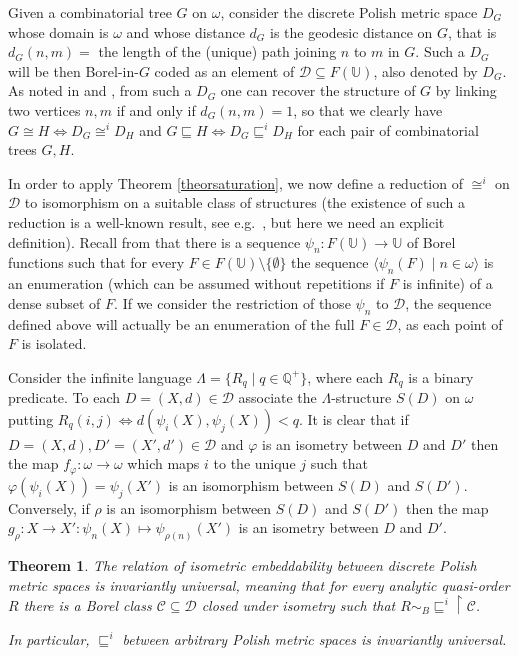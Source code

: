 \documentclass{amsart}
\newtheorem{theorem}{Theorem}[section]
\theoremstyle{definition}
\theoremstyle{remark}
\begin{document}
Given a combinatorial tree $G$ on $\omega$, consider the discrete Polish metric space $D_G$
whose domain is $\omega$ and whose distance $d_G$ is
the geodesic distance on $G$, that is $d_G(n,m) = $ the length of the (unique) path joining
$n$ to $m$ in $G$. Such a $D_G$ will be then
Borel-in-$G$ coded as an element of $\mathcal{D} \subseteq F( \mathbb U )$, also denoted by
$D_G$. As noted in \cite{louros}
and \cite{FriMot}, from such a $D_G$ one can recover the structure of
$G$ by linking two vertices $n,m$ if and only if $d_G(n,m) = 1$, so
that we clearly have $G \cong H \iff D_G \cong^i D_H$ and $G
\sqsubseteq H \iff D_G \sqsubseteq^i D_H$ for each pair of
combinatorial
trees $G,H$.

In order to apply Theorem \ref{theorsaturation}, we now define
a reduction of $\cong^i$ on $\mathcal{D}$ to isomorphism on a suitable
class of structures (the existence of such a reduction is a well-known
result, see e.g.\ \cite{gaokechris}, but here we need an explicit
definition). Recall from \cite[Theorem 12.13]{Kechris1995} that
there is a sequence $\psi_n \colon F(\mathbb{U}) \to \mathbb{U}$ of
Borel functions such that for every $F \in F(\mathbb{U})\setminus\{\emptyset\} $ the sequence
$\langle \psi_n(F) \mid n \in \omega \rangle$ is an enumeration
(which can be assumed without repetitions if $F$ is infinite) of a dense subset of $F$. If we consider the
restriction of those $\psi_n$ to $\mathcal{D}$, the sequence defined
above will actually be an enumeration of the full $F \in \mathcal{D}$, as each
point of $F$ is isolated.

Consider the infinite
language $\Lambda = \{ R_q\mid q\in {\mathbb{Q}}^+\}$, where each $R_q$ is a
binary predicate.
To each $D = (X,d) \in
\mathcal{D}$ associate the $\Lambda $-structure $S(D)$ on $\omega$ putting
$R_q(i,j) \iff d(\psi_i(X),\psi_j(X)) < q$. It is clear that if $D =
(X,d),D' = (X',d') \in \mathcal{D}$ and ${\varphi}$ is an isometry between
$D$ and $D'$ then the map $f_{\varphi} \colon \omega \to \omega$ which maps
$i$ to the unique $j$ such that ${\varphi}(\psi_i(X)) = \psi_j(X')$ is an
isomorphism between $S(D)$ and $S(D')$. Conversely, if $\rho$ is an
isomorphism between $S(D)$ and $S(D')$ then the map $g_\rho \colon X
\to X' \colon \psi_n(X) \mapsto \psi_{\rho(n)}(X')$ is an isometry
between $D$ and $D'$.

\begin{theorem}\label{theordiscrete}
The relation of isometric embeddability between discrete Polish metric
spaces is invariantly universal, meaning that for every analytic
quasi-order $R$ there is a Borel class $\mathcal{C} \subseteq \mathcal{D}$
closed under isometry such that $R \sim_B {{\sqsubseteq^i}
  \restriction \mathcal{C}}$.

In particular, $\sqsubseteq^i$ between arbitrary Polish metric spaces
is invariantly universal.
\end{theorem}
\end{document}
